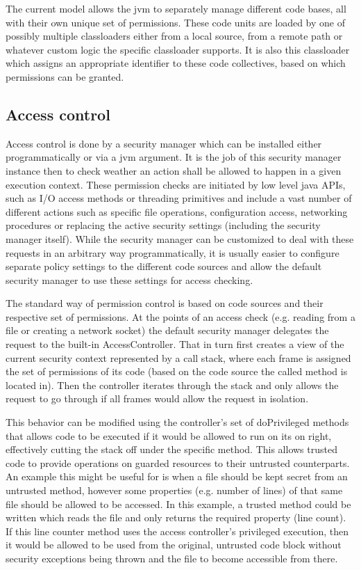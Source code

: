 \documentclass[11pt,a4paper,oneside]{report}
\begin{document}
	The current model allows the jvm to separately manage different code bases, all with their own unique set of permissions. These code units are loaded by one of possibly multiple classloaders either from a local source, from a remote path or whatever custom logic the specific classloader supports. It is also this classloader which assigns an appropriate identifier to these code collectives, based on which permissions can be granted.
	
	\subsection{Access control}
	
	Access control is done by a security manager which can be installed either programmatically or via a jvm argument. It is the job of this security manager instance then to check weather an action shall be allowed to happen in a given execution context. These permission checks are initiated by low level java APIs, such as I/O access methods or threading primitives and include a vast number of different actions such as specific file operations, configuration access, networking procedures or replacing the active security settings (including the security manager itself). While the security manager can be customized to deal with these requests in an arbitrary way programmatically, it is usually easier to configure separate policy settings to the different code sources and allow the default security manager to use these settings for access checking.
	
	The standard way of permission control is based on code sources and their respective set of permissions. At the points of an access check (e.g. reading from a file or creating a network socket) the default security manager delegates the request to the built-in AccessController. That in turn first creates a view of the current security context represented by a call stack, where each frame is assigned the set of permissions of its code (based on the code source the called method is located in). Then the controller iterates through the stack and only allows the request to go through if all frames would allow the request in isolation.
	
	This behavior can be modified using the controller's set of doPrivileged methods that allows code to be executed if it would be allowed to run on its on right, effectively cutting the stack off under the specific method. This allows trusted code to provide operations on guarded resources to their untrusted counterparts. An example this might be useful for is when a file should be kept secret from an untrusted method, however some properties (e.g. number of lines) of that same file should be allowed to be accessed. In this example, a trusted method could be written which reads the file and only returns the required property (line count). If this line counter method uses the access controller's privileged execution, then it would be allowed to be used from the original, untrusted code block without security exceptions being thrown and the file to become accessible from there.
\end{document}
